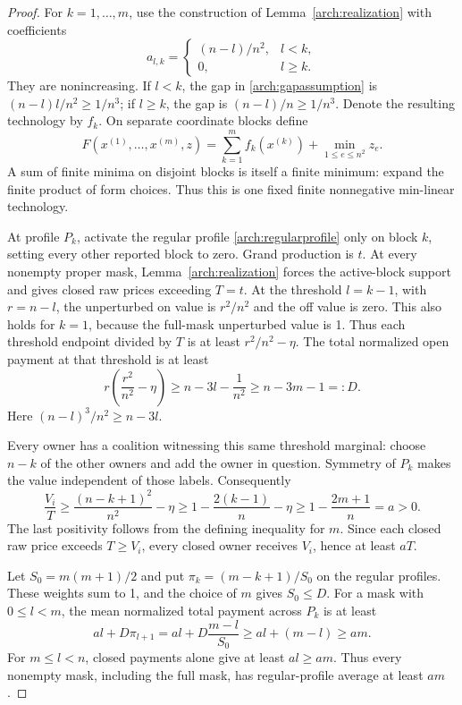 \documentclass[11pt]{article}
\theoremstyle{definition}\newtheorem{definition}[theorem]{Definition}
\theoremstyle{remark}\newtheorem{remark}[theorem]{Remark}
\begin{document}
\begin{proof}
For $k=1,\ldots,m$, use the construction of Lemma~\ref{arch:realization}
with coefficients
\[
 a_{l,k}=\begin{cases}(n-l)/n^2,&l<k,\\0,&l\ge k.
 \end{cases}
\]
They are nonincreasing. If $l<k$, the gap in
\eqref{arch:gapassumption} is $(n-l)l/n^2\ge1/n^3$; if $l\ge k$, the
gap is $(n-l)/n\ge1/n^3$. Denote the resulting technology by $f_k$.
On separate coordinate blocks define
\begin{equation}\label{arch:ownertechnology}
 F(x^{(1)},\ldots,x^{(m)},z)
   =\sum_{k=1}^m f_k(x^{(k)})+\min_{1\le e\le n^2}z_e.
\end{equation}
A sum of finite minima on disjoint blocks is itself a finite minimum:
expand the finite product of form choices. Thus this is one fixed
finite nonnegative min-linear technology.

At profile $P_k$, activate the regular profile
\eqref{arch:regularprofile} only on block $k$, setting every other reported
block to zero. Grand production is $t$. At every nonempty proper mask,
Lemma~\ref{arch:realization} forces the active-block support and gives
closed raw prices exceeding $T=t$.
At the threshold $l=k-1$, with $r=n-l$, the unperturbed on value is
$r^2/n^2$ and the off value is zero. This also holds for $k=1$, because
the full-mask unperturbed value is 1. Thus each threshold endpoint divided
by $T$ is at least $r^2/n^2-\eta$.
The total normalized open payment at that threshold is at least
\[
 r\left(\frac{r^2}{n^2}-\eta\right)
 \ge n-3l-\frac1{n^2}
 \ge n-3m-1=:D.
\]
Here $(n-l)^3/n^2\ge n-3l$.

Every owner has a coalition witnessing this same threshold marginal:
choose $n-k$ of the other owners and add the owner in question. Symmetry
of $P_k$ makes the value independent of those labels. Consequently
\[
 \frac{V_i}{T}\ge\frac{(n-k+1)^2}{n^2}-\eta
 \ge1-\frac{2(k-1)}n-\eta
 \ge1-\frac{2m+1}n=a>0.
\]
The last positivity follows from the defining inequality for $m$.
Since each closed raw price exceeds $T\ge V_i$, every closed owner
receives $V_i$, hence at least $aT$.

Let $S_0=m(m+1)/2$ and put
$\pi_k=(m-k+1)/S_0$ on the regular profiles. These weights sum to 1,
and the choice of $m$ gives $S_0\le D$. For a mask with $0\le l<m$,
the mean normalized total payment across $P_k$ is at least
\[
 al+D\pi_{l+1}
 =al+D\frac{m-l}{S_0}
 \ge al+(m-l)\ge am.
\]
For $m\le l<n$, closed payments alone give at least $al\ge am$.
Thus every nonempty mask, including the full mask, has regular-profile
average at least $am$.


\end{proof}
\end{document}
